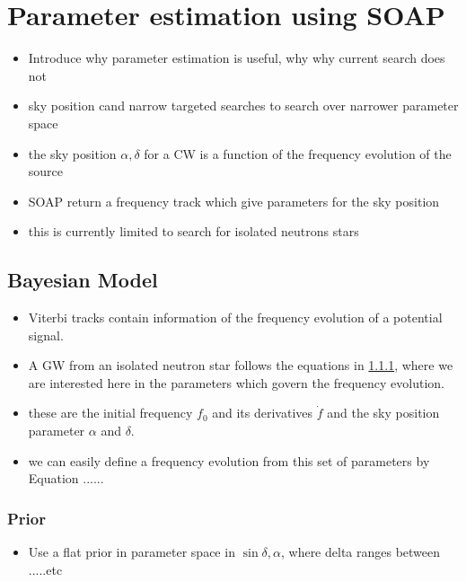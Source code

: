 \chapter{\label{par_est}Parameter estimation using SOAP}


\begin{itemize}
    \item Introduce why parameter estimation is useful, why why current search does not
    \item sky position cand narrow targeted searches to search over narrower parameter space
    \item the sky position $\alpha, \delta$ for a \gls{CW} is a function of the frequency evolution of the source
    \item SOAP return a frequency track which give parameters for the sky position
    \item this is currently limited to search for isolated neutrons stars

\end{itemize}

\section{Bayesian Model}

\begin{itemize}
    \item Viterbi tracks contain information of the frequency evolution of a potential signal.
    \item A \gls{GW} from an isolated neutron star follows the equations in \ref{}, where we are interested here in the parameters which govern the frequency evolution.
    \item these are the initial frequency $f_0$ and its derivatives $\dot{f}$ and the sky position parameter $\alpha$ and $\delta$.
    \item we can easily define a frequency evolution from this set of parameters by Equation ...... 
\end{itemize}

\subsection{Prior}

\begin{itemize}
    \item Use a flat prior in parameter space in $\sin{\delta},\alpha$, where delta ranges between .....etc 
\end{itemize}


